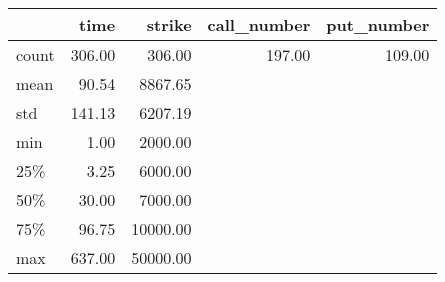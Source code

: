 \begin{tabular}{lrrrr}
\toprule
{} &   time &   strike &  call\_number &  put\_number \\
\midrule
count & 306.00 &   306.00 &       197.00 &      109.00 \\
mean  &  90.54 &  8867.65 &              &             \\
std   & 141.13 &  6207.19 &              &             \\
min   &   1.00 &  2000.00 &              &             \\
25\%   &   3.25 &  6000.00 &              &             \\
50\%   &  30.00 &  7000.00 &              &             \\
75\%   &  96.75 & 10000.00 &              &             \\
max   & 637.00 & 50000.00 &              &             \\
\bottomrule
\end{tabular}
